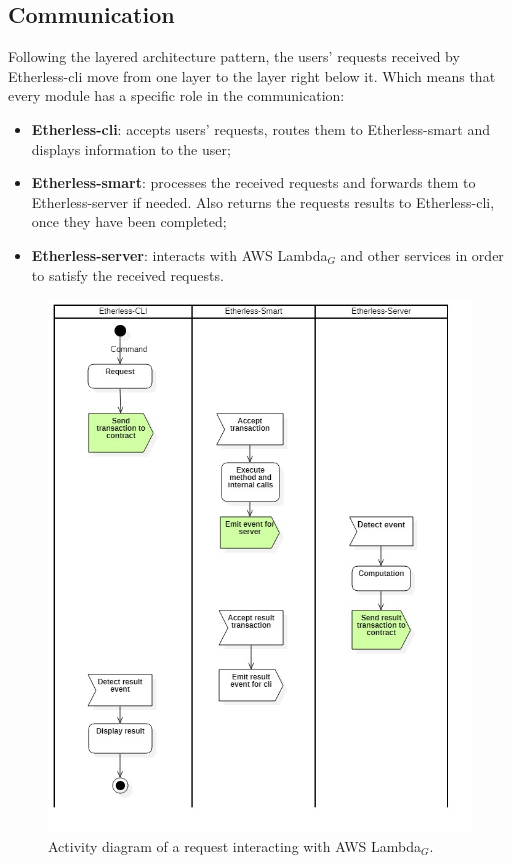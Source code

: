 	\subsection{Communication} %
	Following the layered architecture pattern, the users' requests received by Etherless-cli move from one layer to the layer right below it. Which means that every module has a specific role in the communication:
	\begin{itemize}
		\item \textbf{Etherless-cli}: accepts users' requests, routes them to Etherless-smart and displays information to the user;
		\item \textbf{Etherless-smart}: processes the received requests and forwards them to Etherless-server if needed. Also returns the requests results to Etherless-cli, once they have been completed;
		\item \textbf{Etherless-server}: interacts with AWS Lambda$_{G}$ and other services in order to satisfy the received requests.
	\end{itemize}
	\begin{figure}
		\centering
		\includegraphics[width=0.9\linewidth]{diagrammi/generali/activity_diag_pattern2}
		\caption{Activity diagram of a request interacting with AWS Lambda$_{G}$.}
	\end{figure}
